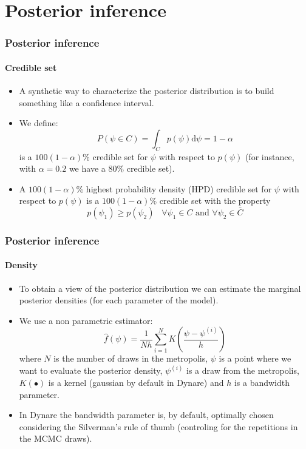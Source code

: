 \documentclass[10pt,slidestop]{beamer}
\begin{document}
\section{Posterior inference}

\begin{frame}
  \frametitle{Posterior inference}
  \framesubtitle{Credible set}

    \begin{itemize}
    \item A synthetic way to characterize the posterior distribution
    is to build something like a confidence interval.

\bigskip

    \item We define:
    \[
        P(\psi \in C) = \int_C p(\psi)\mathrm d\psi = 1-\alpha
    \]
    is a $100(1-\alpha)\%$ credible set for $\psi$ with respect to
    $p(\psi)$ (for instance, with $\alpha=0.2$ we have a 80\% credible set).

\bigskip

    \item A $100(1-\alpha)\%$ highest probability density (HPD) credible set
    for $\psi$ with respect to $p(\psi)$ is a $100(1-\alpha)\%$
    credible set with the property
    \[
        p(\psi_1) \ge p(\psi_2)\;\;\; \forall \psi_1 \in C \mbox{ and
        } \forall \psi_2 \in \bar C
    \]
    \end{itemize}

  \end{frame}


\begin{frame}
  \frametitle{Posterior inference}
  \framesubtitle{Density}

    \begin{itemize}

    \item To obtain a view of the posterior distribution we can
    estimate the marginal posterior densities (for each parameter of the model).

\bigskip

    \item We use a non parametric estimator:
    {
    \[
        \hat{f}(\psi) = \frac{1}{Nh}\sum_{i=1}^N K\left(\frac{\psi-\psi^{(i)}}{h}\right)
    \]
    }
    where $N$ is the number of draws in the metropolis, $\psi$ is
    a  point where we want to evaluate the posterior density,
    $\psi^{(i)}$ is a draw from the metropolis, $K(\bullet)$ is a
    kernel (gaussian by default in Dynare) and $h$ is a bandwidth
    parameter.

\bigskip

    \item In Dynare the bandwidth parameter is, by default, optimally
    chosen considering the Silverman's rule of thumb (controling for
    the repetitions in the MCMC draws).
    \end{itemize}

\end{frame}
\end{document}
